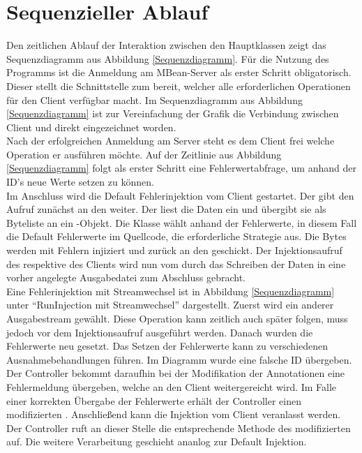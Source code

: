 \section{Sequenzieller Ablauf} 

Den zeitlichen Ablauf der Interaktion zwischen den Hauptklassen zeigt das Sequenzdiagramm aus Abbildung \ref{Sequenzdiagramm}. F\"ur die Nutzung des Programms ist die Anmeldung am MBean-Server als erster Schritt obligatorisch. Dieser stellt die Schnittstelle zum  bereit, welcher alle erforderlichen Operationen f\"ur den Client verfügbar macht. Im Sequenzdiagramm aus Abbildung \ref{Sequenzdiagramm} ist zur Vereinfachung der Grafik die Verbindung zwischen Client und  direkt eingezeichnet worden. \\
Nach der erfolgreichen Anmeldung am Server steht es dem Client frei welche Operation er ausf\"uhren m\"ochte. Auf der Zeitlinie aus Abbildung \ref{Sequenzdiagramm} folgt als erster Schritt eine Fehlerwertabfrage, um anhand der ID's neue Werte setzen zu können.\\
Im Anschluss wird die Default Fehlerinjektion vom Client gestartet. Der  gibt den Aufruf zunächst an den  weiter. Der  liest die Daten ein und übergibt sie als Byteliste an ein -Objekt. Die Klasse  wählt anhand der Fehlerwerte, in diesem Fall die Default Fehlerwerte im Quellcode, die erforderliche Strategie aus. Die Bytes werden mit Fehlern injiziert und zurück an den  geschickt. 
Der Injektionsaufruf des  respektive des Clients wird nun vom  durch das Schreiben der Daten in eine vorher angelegte Ausgabedatei zum Abschluss gebracht. \\
Eine Fehlerinjektion mit Streamwechsel ist in Abbildung \ref{Sequenzdiagramm} unter ``RunInjection mit Streamwechsel'' dargestellt. Zuerst wird ein anderer Ausgabestream gewählt. Diese Operation kann zeitlich auch später folgen, muss jedoch vor dem Injektionsaufruf ausgeführt werden. Danach wurden die Fehlerwerte neu gesetzt. Das Setzen der Fehlerwerte kann zu verschiedenen Ausnahmebehandlungen führen. Im Diagramm wurde eine falsche ID übergeben. Der Controller bekommt daraufhin bei der Modifikation der Annotationen eine Fehlermeldung übergeben, welche an den Client weitergereicht wird. Im Falle einer korrekten Übergabe der Fehlerwerte erhält der Controller einen modifizierten . Anschlie\ss end kann die Injektion vom Client veranlasst werden. Der Controller ruft an dieser Stelle die entsprechende Methode des modifizierten  auf. Die weitere Verarbeitung geschieht ananlog zur Default Injektion.



